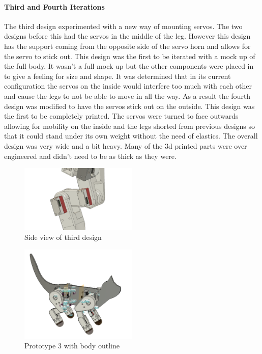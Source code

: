         \paragraph{Third and Fourth Iterations}
        The third design experimented with a new way of mounting servos. The two designs before this had the servos in the middle of the leg. However this design has the support coming from the opposite side of the servo horn and allows for the servo to stick out. This design was the first to be iterated with a mock up of the full body. It wasn't a full mock up but the other components were placed in to give a feeling for size and shape. It was determined that in its current configuration the servos on the inside would interfere too much with each other and cause the legs to not be able to move in all the way. As a result the fourth design was modified to have the servos stick out on the outside. This design was the first to be completely printed. The servos were turned to face outwards allowing for mobility on the inside and the legs shorted from previous designs so that it could stand under its own weight without the need of elastics. The overall design was very wide and a bit heavy. Many of the 3d printed parts were over engineered and didn’t need to be as thick as they were. 
        
         \begin{figure}[H]
                \centering
                \includegraphics[width=0.5\textwidth]{figures/Prototype3side.png}
                \caption{Side view of third design}
                \label{fig:SideviewPrototype3}
        \end{figure}                
            
        \begin{figure}[H]
                \centering
                \includegraphics[width=0.5\textwidth]{figures/Prototype3outline.PNG}
                \caption{Prototype 3 with body outline}
                \label{fig:BodyOutlinePrototype3}
        \end{figure}  

